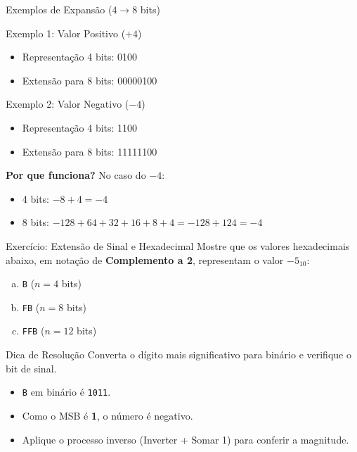 \begin{frame}{Exemplos de Expansão ($4 \rightarrow 8$ bits)}
    \begin{exampleblock}{Exemplo 1: Valor Positivo ($+4$)}
        \begin{itemize}
            \item Representação 4 bits: {\color{blue}0}100
            \item Extensão para 8 bits: {\color{blue}0000}{\color{blue}0}100
        \end{itemize}
    \end{exampleblock}

    \begin{exampleblock}{Exemplo 2: Valor Negativo ($-4$)}
        \begin{itemize}
            \item Representação 4 bits: {\color{red}1}100
            \item Extensão para 8 bits: {\color{red}1111}{\color{red}1}100
        \end{itemize}
    \end{exampleblock}

    \vspace{0.3cm}
    \textbf{Por que funciona?}
    No caso do $-4$:
    \begin{itemize}
        \item 4 bits: $-8 + 4 = -4$
        \item 8 bits: $-128 + 64 + 32 + 16 + 8 + 4 = -128 + 124 = -4$
    \end{itemize}
\end{frame}
\begin{frame}{Exercício: Extensão de Sinal e Hexadecimal}
    Mostre que os valores hexadecimais abaixo, em notação de \textbf{Complemento a 2}, representam o valor $-5_{10}$:

    \begin{enumerate}[a)]
        \item \texttt{B} ($n=4$ bits)
        \item \texttt{FB} ($n=8$ bits)
        \item \texttt{FFB} ($n=12$ bits)
    \end{enumerate}

    \begin{block}{Dica de Resolução}
        Converta o dígito mais significativo para binário e verifique o bit de sinal.
        \begin{itemize}
            \item \texttt{B} em binário é \texttt{1011}.
            \item Como o MSB é \textbf{1}, o número é negativo.
            \item Aplique o processo inverso (Inverter + Somar 1) para conferir a magnitude.
        \end{itemize}
    \end{block}
\end{frame}

